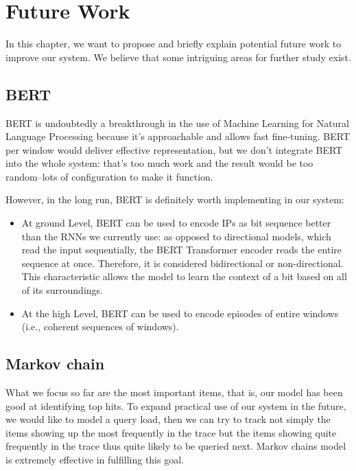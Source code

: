 \chapter{Future Work}
\label{chapter:future_work}
In this chapter, we want to propose and briefly explain potential future work to improve our system. We believe that some intriguing areas for further study exist. 

\section{BERT}

BERT is undoubtedly a breakthrough in the use of Machine Learning for Natural Language Processing because it’s approachable and allows fast fine-tuning. BERT per window would deliver effective representation, but we don't integrate BERT into the whole system: that’s too much work and the result would be too random–lots of configuration to make it function. 

However, in the long run, BERT is definitely worth implementing in our system:

\begin{itemize}
    \item At ground Level, BERT can be used to encode IPs as bit sequence better than the RNNs we currently use: as opposed to directional models, which read the input sequentially, the BERT Transformer encoder reads the entire sequence at once. Therefore, it is considered bidirectional or non-directional. This characteristic allows the model to learn the context of a bit based on all of its surroundings. 
    
    \item At the high Level, BERT can be used to encode episodes of entire windows (i.e., coherent sequences of windows).

\end{itemize}


\section{Markov chain}
What we focus so far are the most important items, that is, our model has been good at identifying top hits. To expand practical use of our system in the future, we would like to model a query load, then we can try to track not simply the items showing up the most frequently in the trace but the items showing quite frequently in the trace thus quite likely to be queried next. Markov chains model is extremely effective in fulfilling this goal.

